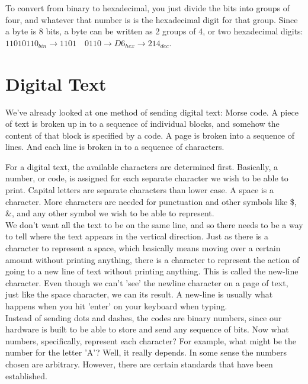 To convert from binary to hexadecimal, you just divide the bits into groups of four, and whatever that number is is the hexadecimal digit for that group. Since a byte is 8 bits, a byte can be written as 2 groups of 4, or two hexadecimal digits: \(11010110_{bin} \rightarrow 1101\quad0110 \rightarrow D6_{hex} \rightarrow 214_{dec}\).

\section{Digital Text}

We've already looked at one method of sending digital text: Morse code. A piece of text is broken up in to a sequence of individual blocks, and somehow the content of that block is specified by a code. A page is broken into a sequence of lines. And each line is broken in to a sequence of characters.\\

\begin{center}\end{center}

For a digital text, the available characters are determined first. Basically, a number, or code, is assigned for each separate character we wish to be able to print. Capital letters are separate characters than lower case. A space is a character. More characters are needed for punctuation and other symbols like \$, \&, and any other symbol we wish to be able to represent.\\

We don't want all the text to be on the same line, and so there needs to be a way to tell where the text appears in the vertical direction. Just as there is a character to represent a space, which basically means moving over a certain amount without printing anything, there is a character to represent the action of going to a new line of text without printing anything. This is called the new-line character. Even though we can't 'see' the newline character on a page of text, just like the space character, we can its result. A new-line is usually what happens when you hit 'enter' on your keyboard when typing.\\

Instead of sending dots and dashes, the codes are binary numbers, since our hardware is built to be able to store and send any sequence of bits. Now what numbers, specifically, represent each character? For example, what might be the number for the letter 'A'? Well, it really depends. In some sense the numbers chosen are arbitrary. However, there are certain standards that have been established.\\

